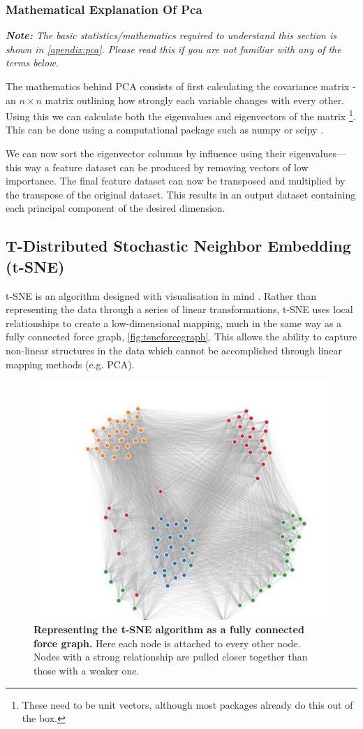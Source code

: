 \subsubsection{Mathematical Explanation Of Pca}
\emph{\textbf{Note:} The basic statistics/mathematics required to understand this section is shown in \autoref{apendix:pca}. Please read this if you are not familiar with any of the terms below.
}

The mathematics behind PCA consists of first calculating the covariance matrix - an $n \times n$ matrix outlining how strongly each variable changes with every other. Using this we can calculate both the eigenvalues and eigenvectors of the matrix \footnote{These need to be unit vectors, although most packages already do this out of the box.}. This can be done using a computational package such as numpy or scipy \citep{numpy,scipy}.

We can now sort the eigenvector columns by influence using their eigenvalues—this way a feature dataset can be produced by removing vectors of low importance. The final feature dataset can now be transposed and multiplied by the transpose of the original dataset. This results in an output dataset containing each principal component of the desired dimension.



\subsection{T-Distributed Stochastic Neighbor Embedding (t-SNE)}\label{sec:overcrowd}

t-SNE is an algorithm designed with visualisation in mind \citep{tsne}. Rather than representing the data through a series of linear transformations, t-SNE uses local relationships to create a low-dimensional mapping, much in the same way as a fully connected force graph, \autoref{fig:tsneforcegraph}. This allows the ability to capture non-linear structures in the data which cannot be accomplished through linear mapping methods (e.g. PCA).

\begin{figure}[H]
    \centering
    \includegraphics[width=.6\textwidth]{./4fig/tsneforcegraph.png}
    \caption{\textbf{Representing the t-SNE algorithm as a fully connected force graph.} Here each node is attached to every other node. Nodes with a strong relationship are pulled closer together than those with a weaker one.}
    \label{fig:tsneforcegraph}
\end{figure}



